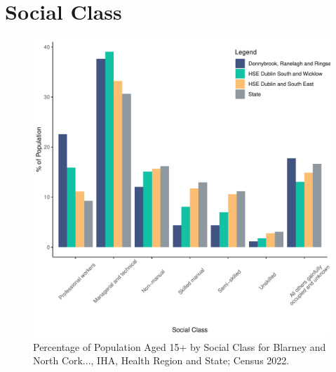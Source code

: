 \documentclass{article}
\begin{document}
\section{Social Class}\label{sect:SC}
\begin{figure}[H]
	\centering
	\includegraphics[width = 140mm]{../figures/SocialClassED.pdf}
	\caption{Percentage of Population Aged 15+ by Social Class for Blarney and North Cork..., IHA, Health Region and State; Census 2022.}
	\label{fig:vbnv}
	\end{figure}
\end{document}
